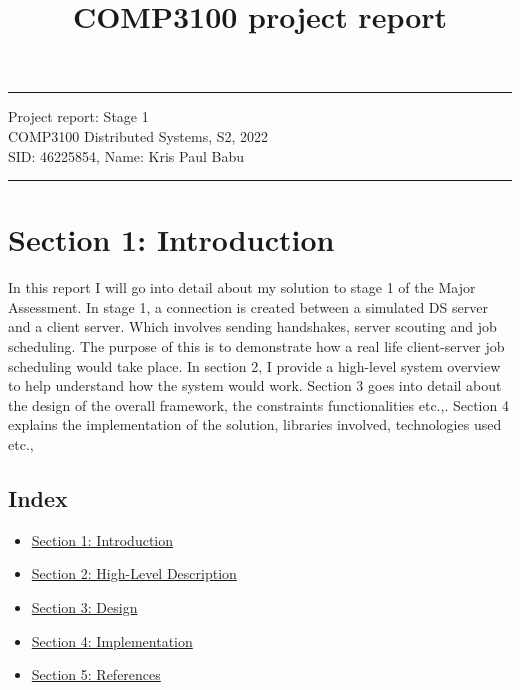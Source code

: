 \documentclass[a4paper]{article} %
\begin{document}

\title{COMP3100 project report} %
\fancyhead[C]{}
\hrule \medskip %
\begin{minipage}{1\textwidth} %
\centering 
\large %
Project report: Stage 1\\ %
COMP3100 Distributed Systems, S2, 2022\\
\normalsize %
SID: 46225854, Name: Kris Paul Babu
\end{minipage}
\medskip\hrule %
\bigskip

\section*{Section 1: Introduction}
\label{sec:section1}
In this report I will go into detail about my solution to stage 1 of the Major Assessment. In stage 1,  
a connection is created between a simulated DS server and a client server. Which involves sending handshakes, 
server scouting and job scheduling. The purpose of this is to demonstrate how a real life client-server 
job scheduling would take place. In section 2, I provide a high-level system overview to help understand how 
the system would work. Section 3 goes into detail about the design of the overall framework, the constraints 
functionalities etc.,. Section 4 explains the implementation of the solution, libraries involved, technologies 
used etc., 

\subsection*{Index}
\begin{itemize}
    \item \hyperref[sec:section1]{Section 1: Introduction}
    \item \hyperref[sec:section2]{Section 2: High-Level Description}
    \item \hyperref[sec:section3]{Section 3: Design}
    \item \hyperref[sec:section4]{Section 4: Implementation}
    \item \hyperref[sec:section5]{Section 5: References}
\end{itemize}
\end{document}
